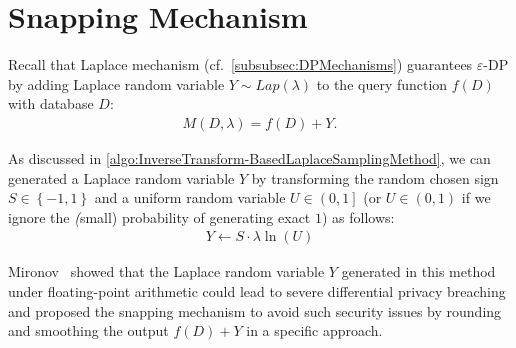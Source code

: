 \section{Snapping Mechanism}
\label{sec:snappingMechanism}
Recall that Laplace mechanism (cf.~\autoref{subsubsec:DPMechanisms}) guarantees $\varepsilon$-DP by adding Laplace random variable $Y \sim Lap\left(\lambda\right) $ to the query function $f\left(D\right)  $ with database $D$:
\begin{equation}
    \begin{split}
        M\left(D, \lambda\right)=f\left(D\right)+Y.
    \end{split}
\end{equation}


As discussed in \autoref{algo:InverseTransform-BasedLaplaceSamplingMethod}, we can generated a Laplace random variable $Y$ by transforming the random chosen sign $S\in \left\{-1,1\right\} $ and a uniform random variable $U \in \left(0,1\right] $ (or $U \in \left(0,1\right) $ if we ignore the \textit(small) probability of generating exact $1$) as follows:
\begin{equation}
    \begin{split}
        Y \gets S \cdot \lambda \ln\left(U\right)
    \end{split}
\end{equation}

Mironov~\cite{mironov2012significance} showed that the Laplace random variable $Y$ generated in this method under floating-point arithmetic could lead to severe differential privacy breaching and proposed the snapping mechanism to avoid such security issues by rounding and smoothing the output $f\left(D\right)+Y$ in a specific approach.


